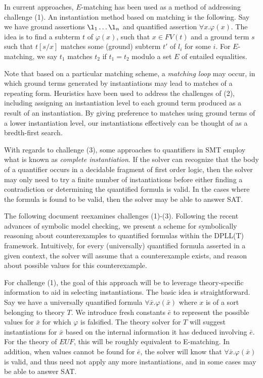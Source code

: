 \documentclass{llncs}
\begin{document}
In current approaches, $E$-matching has been used as a method of addressing challenge (1).
An instantiation method based on matching is the following.
Say we have ground assertions $\l_1 \ldots \l_n$ and quantified assertion $\forall x. \varphi(x)$.
The idea is to find a subterm $t$ of $\varphi(x)$, such that $x \in FV( t )$ and a ground term $s$ such that $t[s/x]$ matches some (ground) subterm $t'$ of $l_i$ for some $i$.
For $E$-matching, we say $t_1$ matches $t_2$ if $t_1 = t_2$ modulo a set $E$ of entailed equalities.

Note that based on a particular matching scheme, a \emph{matching loop} may occur, in which ground terms generated by instantiations may lead to matches of a repeating form.
Heuristics have been used to address the challenges of (2), including assigning an instantiation level to each ground term produced as a result of an instantiation.
By giving preference to matches using ground terms of a lower instantiation level, our instantiations effectively can be thought of as a bredth-first search.

With regards to challenge (3), some approaches to quantifiers in SMT employ what is known as \emph{complete instantiation}.
If the solver can recognize that the body of a quantifier occurs in a decidable fragment of first order logic, then the solver may only need to try a finite number of instantiations before either finding a contradiction or determining the quantified formula is valid.
In the cases where the formula is found to be valid, then the solver may be able to answer SAT.

The following document reexamines challenges (1)-(3).
Following the recent advances of symbolic model checking, we present a scheme for symbolically reasoning about counterexamples to quantified formulas within the DPLL(T) framework.
Intuitively, for every (universally) quantified formula asserted in a given context, the solver will assume that a counterexample exists, and reason about possible values for this counterexample.

For challenge (1), the goal of this approach will be to leverage theory-specific information to aid in selecting instantiations.
The basic idea is straightforward.
Say we have a universally quantified formula $\forall \bar{x}. \varphi( \bar{x} )$ where $x$ is of a sort belonging to theory $T$.
We introduce fresh constants $\bar{e}$ to represent the possible values for $\bar{x}$ for which $\varphi$ is falsified.
The theory solver for $T$ will suggest instantiations for $\bar{x}$ based on the internal information it has deduced involving $\bar{e}$.
For the theory of $EUF$, this will be roughly equivalent to E-matching.
In addition, when values cannot be found for $\bar{e}$, the solver will know that $\forall \bar{x}. \varphi( \bar{x} )$ is valid, and thus need not apply any more instantiations, and in some cases may be able to answer SAT.
\end{document}
